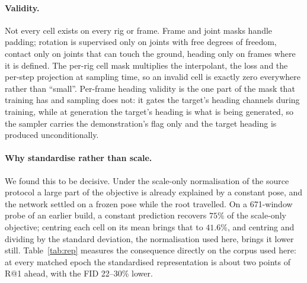 \paragraph{Validity.} Not every cell exists on every rig or frame. Frame and joint masks handle
padding; rotation is supervised only on joints with free degrees of freedom, contact only on joints
that can touch the ground, heading only on frames where it is defined. The per-rig cell mask
multiplies the interpolant, the loss and the per-step projection at sampling time, so an invalid cell
is exactly zero everywhere rather than ``small''. Per-frame heading validity is the one part of the
mask that training has and sampling does not: it gates the target's heading channels during training,
while at generation the target's heading is what is being generated, so the sampler carries the
demonstration's flag only and the target heading is produced unconditionally.


\paragraph{Why standardise rather than scale.} We found this to be decisive. Under the scale-only
normalisation of the source protocol a large part of the objective is already explained by a constant
pose, and the network settled on a frozen pose while the root travelled. On a 671-window probe of an
earlier build, a constant prediction recovers $75\%$ of the scale-only objective; centring each cell
on its mean brings that to $41.6\%$, and centring and dividing by the standard deviation, the
normalisation used here, brings it lower still. Table~\ref{tab:rep} measures the consequence directly on
the corpus used here: at every matched epoch the standardised representation is about two points of
R@1 ahead, with the FID \num{22}--\num{30}\% lower. 

